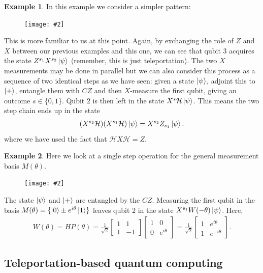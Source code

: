 \documentclass{book}
\theoremstyle{definition}
\newtheorem{exmp}{Example}[section]
\newcommand{\had}{\mathcal{H}}
\newcommand{\f}[2]{\frac{#1}{#2}}
\newcommand{\fig}[2]{
	\begin{figure}[!htb]
		\centering
		\texttt{[image: \#2]}
	\end{figure}}
\begin{document}
\begin{exmp}
	In this example we consider a simpler pattern:
	
	\fig{0.3}{fig6}
	
	This is more familiar to us at this point. Again, by exchanging the role of $Z$ and $X$ between our previous examples and this one, we can see that qubit 3 acquires the state $Z^{s_1}X^{s_2}\ket{\psi}$ (remember, this is just teleportation). The two $X$ measurements may be done in parallel but we can also consider this process as a sequence of two identical steps as we have seen: given a state $\ket{\psi}$, adjoint this to $\ket{+}$, entangle them with $CZ$ and then $X$-measure the first qubit, giving an outcome $s \in \{0,1\}$. Qubit 2 is then left in the state $X^s \had \ket{\psi}$. This means the two step chain ends up in the state
	\begin{align}
	(X^{s_2}\had )(X^{s_1}\had)\ket{\psi} = X^{s_2}Z_{s_1}\ket{\psi}.
	\end{align} 
	where we have used the fact that $\had X \had  = Z$. 
\end{exmp}



\begin{exmp}
	Here we look at a single step operation for the general measurement basis $M(\theta)$.
	
	\fig{0.3}{fig7}
	
	The state $\ket{\psi}$ and $\ket{+}$ are entangled by the $CZ$. Measuring the first qubit in the basis $M(\theta) = \{ \ket{0} \pm e^{i\theta}\ket{1} \}$ leaves qubit 2 in the state $X^{s_1}W(-\theta)\ket{\psi}$. Here,
	\begin{align}
	W(\theta) = HP(\theta) = \f{1}{\sqrt{2}}\begin{bmatrix}
	1 & 1 \\  1 & -1
	\end{bmatrix}\begin{bmatrix}
	1 & 0 \\ 0 & e^{i\theta}
	\end{bmatrix} = \f{1}{\sqrt{2}}\begin{bmatrix}
	1 & e^{i\theta} \\ 1& e^{-i\theta}
	\end{bmatrix}.
	\end{align}
\end{exmp}


\subsection{Teleportation-based quantum computing}
\end{document}
